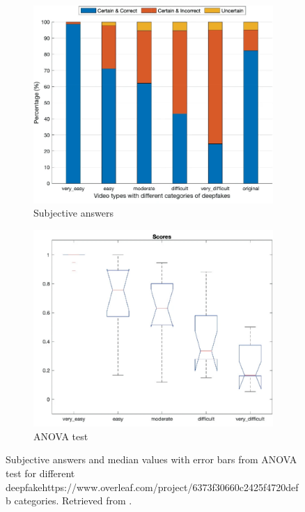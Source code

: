\begin{figure}[H]
    \begin{subfigure}[h]{.475\linewidth}
        \centering
        \includegraphics[width=1\linewidth]{other-fig/subjective_answers_a.png}
        \caption{Subjective answers}
    \end{subfigure}
    \hfill
    \begin{subfigure}[h]{.475\linewidth}
        \centering
        \includegraphics[width=1\linewidth]{other-fig/subjective_answers_b.png}
        \caption{ANOVA test}
    \end{subfigure}
    \caption{Subjective answers and median values with error bars from ANOVA test for different deepfakehttps://www.overleaf.com/project/6373f30660c2425f4720defb categories. Retrieved from \cite{TheThreatOfDeepfakes}.}
    \label{fig:subjective_answers}
\end{figure}

